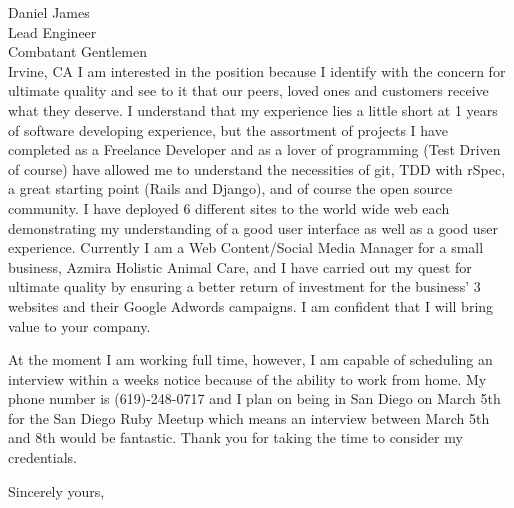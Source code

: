 \documentclass{letter} %
\begin{document}
\begin{letter}{Daniel James \\
Lead Engineer \\
Combatant Gentlemen \\
Irvine, CA}
\noindent I am interested in the position because I identify with the concern for ultimate quality and see to it that our peers, loved ones and customers receive what they deserve.  I understand that my experience lies a little short at 1 years of software developing experience, but the assortment of projects I have completed as a Freelance Developer and as a lover of programming (Test Driven of course) have allowed me to understand the necessities of git, TDD with rSpec, a great starting point (Rails and Django), and of course the open source community.  I have deployed 6 different sites to the world wide web each demonstrating my understanding of a good user interface as well as a good user experience.  Currently I am a Web Content/Social Media Manager for a small business, Azmira Holistic Animal Care, and I have carried out my quest for ultimate quality by ensuring a better return of investment for the business' 3 websites and their Google Adwords campaigns.  I am confident that I will bring value to your company.
 

\noindent At the moment I am working full time, however, I am capable of scheduling an interview within a weeks notice because of the ability to work from home.  My phone number is (619)-248-0717 and I plan on being in San Diego on March 5th for the San Diego Ruby Meetup which means an interview between March 5th and 8th would be fantastic.  Thank you for taking the time to consider my credentials.
 
\closing{Sincerely yours,} 
 

 

\end{letter}
 
\end{document}
